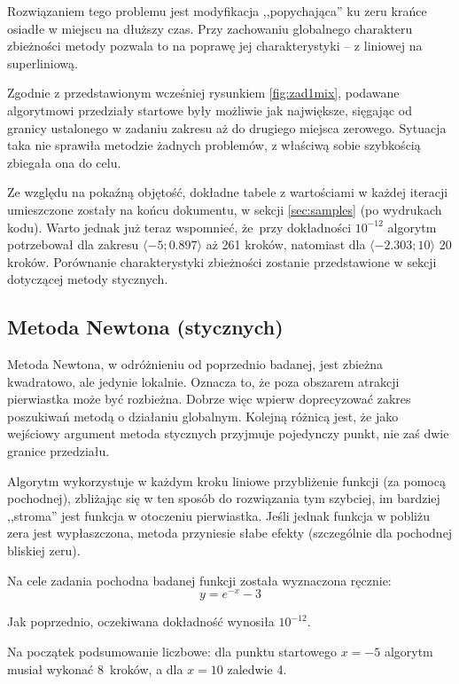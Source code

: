 \documentclass[12pt]{article}
\begin{document}
Rozwiązaniem tego problemu jest modyfikacja ,,popychająca'' ku zeru krańce osiadłe w miejscu na dłuższy czas. Przy zachowaniu globalnego charakteru zbieżności metody pozwala to na poprawę jej charakterystyki -- z liniowej na superliniową.

Zgodnie z przedstawionym wcześniej rysunkiem \ref{fig:zad1mix}, podawane algorytmowi przedziały startowe były możliwie jak największe, sięgając od granicy ustalonego w zadaniu zakresu aż do drugiego miejsca zerowego. Sytuacja taka nie sprawiła metodzie żadnych problemów, z właściwą sobie szybkością zbiegała ona do celu.

Ze względu na pokaźną objętość, dokładne tabele z wartościami w każdej iteracji umieszczone zostały na końcu dokumentu, w sekcji \ref{sec:samples} (po wydrukach kodu).  
Warto jednak już teraz wspomnieć, że~przy dokładności \( 10^{-12} \) algorytm potrzebował dla zakresu \( \langle -5; 0.897 \rangle \) aż 261 kroków, natomiast dla \( \langle -2.303; 10 \rangle \) 20 kroków.  
Porównanie charakterystyki zbieżności zostanie przedstawione w sekcji dotyczącej metody stycznych.

\subsection{Metoda Newtona (stycznych)}

Metoda Newtona, w odróżnieniu od poprzednio badanej, jest zbieżna kwadratowo, ale jedynie lokalnie. Oznacza to, że poza obszarem atrakcji pierwiastka może być rozbieżna. Dobrze więc wpierw doprecyzować zakres poszukiwań metodą o działaniu globalnym. Kolejną różnicą jest, że jako wejściowy argument metoda stycznych przyjmuje pojedynczy punkt, nie zaś dwie granice przedziału.

Algorytm wykorzystuje w każdym kroku liniowe przybliżenie funkcji (za pomocą pochodnej), zbliżając się w ten sposób do rozwiązania tym szybciej, im bardziej ,,stroma'' jest funkcja w otoczeniu pierwiastka.  
Jeśli jednak funkcja w pobliżu zera jest wypłaszczona, metoda przyniesie słabe efekty (szczególnie dla pochodnej bliskiej zeru).

Na cele zadania pochodna badanej funkcji została wyznaczona ręcznie:
\[ y = e^{-x} - 3 \]

Jak poprzednio, oczekiwana dokładność wynosiła \( 10^{-12} \).

Na początek podsumowanie liczbowe: dla punktu startowego \( x = -5 \) algorytm musiał wykonać 8~kroków, a dla \( x = 10 \) zaledwie 4.
\end{document}
